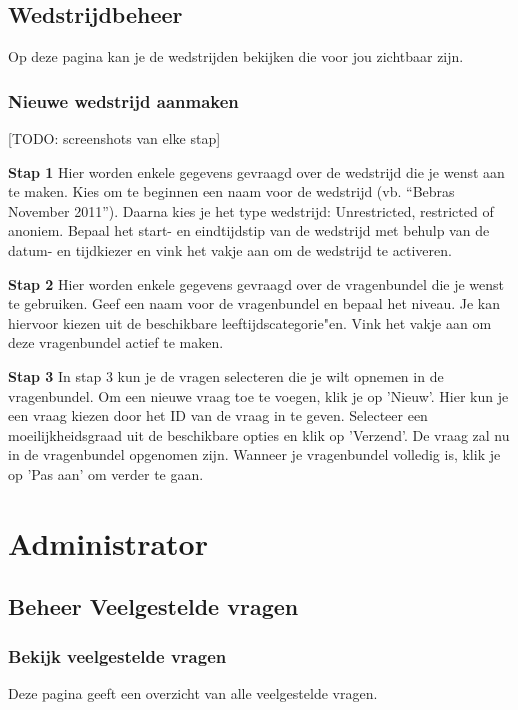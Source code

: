 \documentclass[]{article}
\begin{document}
\subsection{Wedstrijdbeheer}
Op deze pagina kan je de wedstrijden bekijken die voor jou zichtbaar zijn. 

\subsubsection{Nieuwe wedstrijd aanmaken}

[TODO: screenshots van elke stap]

\textbf{Stap 1}
Hier worden enkele gegevens gevraagd over de wedstrijd die je wenst aan te maken. 
Kies om te beginnen een naam voor de wedstrijd (vb. "`Bebras November 2011"'). Daarna kies je het type wedstrijd: Unrestricted, restricted of anoniem. Bepaal het start- en eindtijdstip van de wedstrijd met behulp van de datum- en tijdkiezer en vink het vakje aan om de wedstrijd te activeren.

\textbf{Stap 2}
Hier worden enkele gegevens gevraagd over de vragenbundel die je wenst te gebruiken. 
Geef een naam voor de vragenbundel en bepaal het niveau. Je kan hiervoor kiezen uit de beschikbare leeftijdscategorie"en. Vink het vakje aan om deze vragenbundel actief te maken.

\textbf{Stap 3}
In stap 3 kun je de vragen selecteren die je wilt opnemen in de vragenbundel. Om een nieuwe vraag toe te voegen, klik je op 'Nieuw'. Hier kun je een vraag kiezen door het ID van de vraag in te geven. Selecteer een moeilijkheidsgraad uit de beschikbare opties en klik op 'Verzend'. De vraag zal nu in de vragenbundel opgenomen zijn. Wanneer je vragenbundel volledig is, klik je op 'Pas aan' om verder te gaan.

\section{Administrator}

\subsection{Beheer Veelgestelde vragen}

\subsubsection{Bekijk veelgestelde vragen}
Deze pagina geeft een overzicht van alle veelgestelde vragen.
\end{document}
